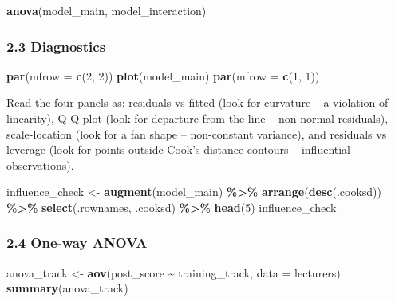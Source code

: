 \documentclass[11pt]{article}
\newenvironment{Shaded}{\begin{snugshade}}{\end{snugshade}}
\newcommand{\AttributeTok}[1]{\textcolor[rgb]{0.13,0.29,0.53}{#1}}
\newcommand{\DecValTok}[1]{\textcolor[rgb]{0.00,0.00,0.81}{#1}}
\newcommand{\FunctionTok}[1]{\textcolor[rgb]{0.13,0.29,0.53}{\textbf{#1}}}
\newcommand{\NormalTok}[1]{#1}
\newcommand{\OtherTok}[1]{\textcolor[rgb]{0.56,0.35,0.01}{#1}}
\newcommand{\SpecialCharTok}[1]{\textcolor[rgb]{0.81,0.36,0.00}{\textbf{#1}}}
\begin{document}
\begin{Shaded}
\begin{Highlighting}[]
\FunctionTok{anova}\NormalTok{(model\_main, model\_interaction)}
\end{Highlighting}
\end{Shaded}

\hypertarget{diagnostics}{%
\subsubsection{2.3 Diagnostics}\label{diagnostics}}

\begin{Shaded}
\begin{Highlighting}[]
\FunctionTok{par}\NormalTok{(}\AttributeTok{mfrow =} \FunctionTok{c}\NormalTok{(}\DecValTok{2}\NormalTok{, }\DecValTok{2}\NormalTok{))}
\FunctionTok{plot}\NormalTok{(model\_main)}
\FunctionTok{par}\NormalTok{(}\AttributeTok{mfrow =} \FunctionTok{c}\NormalTok{(}\DecValTok{1}\NormalTok{, }\DecValTok{1}\NormalTok{))}
\end{Highlighting}
\end{Shaded}

Read the four panels as: residuals vs fitted (look for curvature -- a
violation of linearity), Q-Q plot (look for departure from the line --
non-normal residuals), scale-location (look for a fan shape --
non-constant variance), and residuals vs leverage (look for points
outside Cook's distance contours -- influential observations).

\begin{Shaded}
\begin{Highlighting}[]
\NormalTok{influence\_check }\OtherTok{\textless{}{-}} \FunctionTok{augment}\NormalTok{(model\_main) }\SpecialCharTok{\%\textgreater{}\%}
  \FunctionTok{arrange}\NormalTok{(}\FunctionTok{desc}\NormalTok{(.cooksd)) }\SpecialCharTok{\%\textgreater{}\%}
  \FunctionTok{select}\NormalTok{(.rownames, .cooksd) }\SpecialCharTok{\%\textgreater{}\%}
  \FunctionTok{head}\NormalTok{(}\DecValTok{5}\NormalTok{)}
\NormalTok{influence\_check}
\end{Highlighting}
\end{Shaded}

\hypertarget{one-way-anova}{%
\subsubsection{2.4 One-way ANOVA}\label{one-way-anova}}

\begin{Shaded}
\begin{Highlighting}[]
\NormalTok{anova\_track }\OtherTok{\textless{}{-}} \FunctionTok{aov}\NormalTok{(post\_score }\SpecialCharTok{\textasciitilde{}}\NormalTok{ training\_track, }\AttributeTok{data =}\NormalTok{ lecturers)}
\FunctionTok{summary}\NormalTok{(anova\_track)}
\end{Highlighting}
\end{Shaded}
\end{document}
